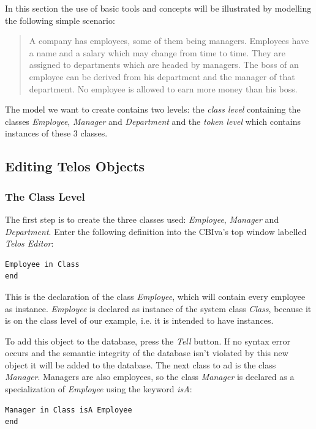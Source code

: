 \documentclass[10pt,a4paper]{article}
\begin{document}
In this section the use of basic tools and concepts will be illustrated
by modelling the following simple scenario:

{\it
\begin{quote}
A company has employees, some of them being managers. Employees
have a name and a salary which may change from time to time. They
are assigned to departments which are headed by managers. The boss
of an employee can be derived from his department and the manager of
that department. No employee is allowed to earn more money than his
boss.
\end{quote}
}

The model we want to create contains two levels: the {\em class level}
containing the classes {\em Employee}, {\em Manager} and {\em Department} and
the {\em token level} which contains instances of these 3 classes.


\subsection{Editing Telos Objects}

\subsubsection{The Class Level}


The first step is to create the three classes used:
{\em Employee}, {\em Manager} and {\em Department}. Enter the following definition
into the CBIva's top window labelled {\em Telos Editor}:

\begin{verbatim}
Employee in Class
end
\end{verbatim}

This is the declaration of the class {\em Employee}, which will contain
every employee as instance. {\em Employee} is declared as instance of the
system class {\em Class}, because it is on the class level of our example,
i.e. it is intended to have instances.


To add this object to the database, press the {\em Tell} button.
If no syntax error occurs and the semantic integrity of the database
isn't violated by this new object it will be added to the database.
The next class to ad is the class {\em Manager}. Managers are also employees,
so the class {\em Manager} is declared as a specialization of {\em Employee}
using the keyword {\em isA}:

\begin{verbatim}
Manager in Class isA Employee
end
\end{verbatim}
\end{document}
